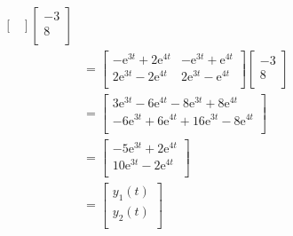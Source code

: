 \documentclass{article}
\newcommand{\e}{\text{e}}
\begin{document}
\begin{itemize}
\begin{align*}
\begin{bmatrix}
        \end{bmatrix}
        \begin{bmatrix}
            -3\\
            8\\
        \end{bmatrix}\\
        &=
        \begin{bmatrix}
            -\e^{3t}+2\e^{4t} & -\e^{3t}+\e^{4t}\\
            2\e^{3t}-2\e^{4t} & 2\e^{3t}-\e^{4t}\\
        \end{bmatrix}
        \begin{bmatrix}
            -3\\
            8\\
        \end{bmatrix}\\
        &=
        \begin{bmatrix}
            3\e^{3t}-6\e^{4t}-8\e^{3t}+8\e^{4t}\\
            -6\e^{3t}+6\e^{4t}+16\e^{3t}-8\e^{4t}\\
        \end{bmatrix}\\
        &=
        \begin{bmatrix}
            -5\e^{3t}+2\e^{4t}\\
            10\e^{3t}-2\e^{4t}\\
        \end{bmatrix}\\
        &=
        \begin{bmatrix}
            y_1(t)\\
            y_2(t)\\
        \end{bmatrix}
    \end{align*}
\end{itemize}
\end{document}
